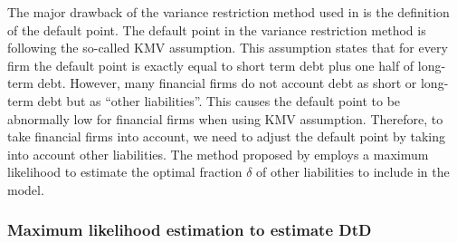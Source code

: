 The major drawback of the variance restriction method used in \citet{DSW} is the definition of the default point. The default point in the variance restriction method is following the so-called KMV assumption. This assumption states that for every firm the default point is exactly equal to short term debt plus one half of long-term debt. However, many financial firms do not account debt as short or long-term debt but as ``other liabilities''. This causes the default point to be abnormally low for financial firms when using KMV assumption. Therefore, to take financial firms into account, we need to adjust the default point by taking into account other liabilities. The method proposed by \citet{Duan2012} employs a maximum likelihood to estimate the optimal fraction $\delta$ of other liabilities to include in the model.

\subsubsection{Maximum likelihood estimation to estimate DtD}


